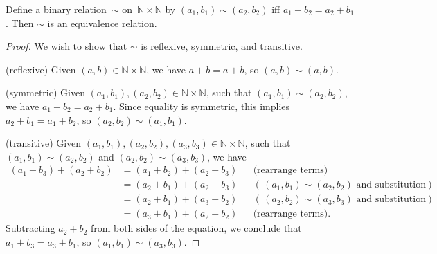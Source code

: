 \begin{eg} \label{NxNEquivRelEg}
Define a binary relation~$\sim$ on~$\mathbb{N} \times \mathbb{N}$ by $(a_1,b_1) \sim (a_2,b_2)$ iff $a_1 + b_2 = a_2 + b_1$. Then $\sim$ is an equivalence relation.

\begin{proof}
We wish to show that $\sim$ is reflexive, symmetric, and transitive.

\noindent
(reflexive) Given $(a,b) \in \mathbb{N} \times \mathbb{N}$, we have $a + b = a + b$, so $(a,b) \sim (a,b)$.

\noindent
(symmetric) Given $(a_1,b_1) , (a_2,b_2) \in \mathbb{N} \times \mathbb{N}$, such that $(a_1,b_1) \sim (a_2,b_2)$, we have $a_1 +b_2 = a_2 + b_1$. Since equality is symmetric, this implies $a_2 + b_1 = a_1 + b_2$, so $(a_2,b_2) \sim (a_1,b_1)$.

\noindent
(transitive) Given $(a_1,b_1) , (a_2,b_2) , (a_3,b_3) \in \mathbb{N} \times \mathbb{N}$, such that $(a_1,b_1) \sim (a_2,b_2)$ and $(a_2,b_2) \sim (a_3,b_3)$, we have 
	\begin{align*}
	(a_1 + b_3) + (a_2 + b_2)
		&= (a_1 + b_2) + (a_2 + b_3) && \text{(rearrange terms)}
		\\&= (a_2 + b_1) + (a_2 + b_3) && (\,(a_1,b_1) \sim (a_2,b_2)\text{ and substitution})
		\\&= (a_2 + b_1) + (a_3 + b_2) && (\,(a_2,b_2) \sim (a_3,b_3)\text{ and substitution})
		\\&= (a_3 + b_1) + (a_2 + b_2) && \text{(rearrange terms)} .
	\end{align*}
Subtracting $a_2 + b_2$ from both sides of the equation, we conclude that $a_1 + b_3 = a_3 + b_1$,
so $(a_1,b_1) \sim (a_3,b_3)$.
\end{proof}
\end{eg}



